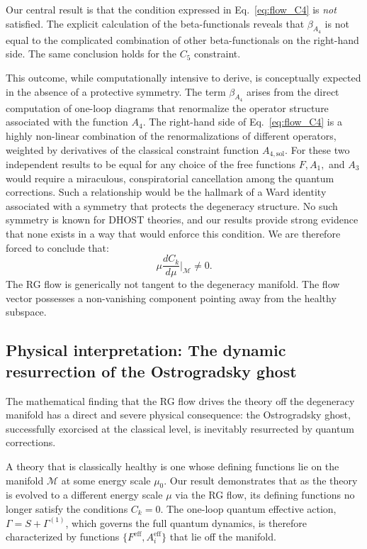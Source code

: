 \documentclass[twocolumn]{aastex631}
\begin{document}
Our central result is that the condition expressed in Eq.~\eqref{eq:flow_C4} is \textit{not} satisfied. The explicit calculation of the beta-functionals reveals that $\beta_{A_4}$ is not equal to the complicated combination of other beta-functionals on the right-hand side. The same conclusion holds for the $C_5$ constraint.

This outcome, while computationally intensive to derive, is conceptually expected in the absence of a protective symmetry. The term $\beta_{A_4}$ arises from the direct computation of one-loop diagrams that renormalize the operator structure associated with the function $A_4$. The right-hand side of Eq.~\eqref{eq:flow_C4} is a highly non-linear combination of the renormalizations of different operators, weighted by derivatives of the classical constraint function $A_{4,\text{sol}}$. For these two independent results to be equal for any choice of the free functions $F, A_1,$ and $A_3$ would require a miraculous, conspiratorial cancellation among the quantum corrections. Such a relationship would be the hallmark of a Ward identity associated with a symmetry that protects the degeneracy structure. No such symmetry is known for DHOST theories, and our results provide strong evidence that none exists in a way that would enforce this condition. We are therefore forced to conclude that:
\begin{equation}
    \mu \frac{dC_k}{d\mu} \bigg|_{\mathcal{M}} \neq 0.
\end{equation}
The RG flow is generically not tangent to the degeneracy manifold. The flow vector possesses a non-vanishing component pointing away from the healthy subspace.

\subsection{Physical interpretation: The dynamic resurrection of the Ostrogradsky ghost}

The mathematical finding that the RG flow drives the theory off the degeneracy manifold has a direct and severe physical consequence: the Ostrogradsky ghost, successfully exorcised at the classical level, is inevitably resurrected by quantum corrections.

A theory that is classically healthy is one whose defining functions lie on the manifold $\mathcal{M}$ at some energy scale $\mu_0$. Our result demonstrates that as the theory is evolved to a different energy scale $\mu$ via the RG flow, its defining functions no longer satisfy the conditions $C_k=0$. The one-loop quantum effective action, $\Gamma = S + \Gamma^{(1)}$, which governs the full quantum dynamics, is therefore characterized by functions $\{F^{\text{eff}}, A_i^{\text{eff}}\}$ that lie off the manifold.
\end{document}
